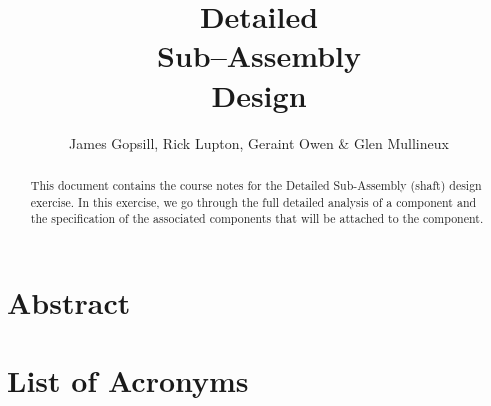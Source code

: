 \documentclass[]{course-notes}
\title{Detailed \\ Sub--Assembly\\ Design}
\author[Gopsill et al.]{\normalsize James Gopsill, Rick Lupton, Geraint Owen \& Glen Mullineux}
\begin{document}
\maketitle

\section*{Abstract}

\begin{abstract}
    This document contains the course notes for the Detailed Sub-Assembly (shaft) design exercise. 
    In this exercise, we go through the full detailed analysis of a component and the specification of the associated components that will be attached to the component. 
\end{abstract}

\setcounter{tocdepth}{2}
\tableofcontents
\listoffigures
\listoftables

\section*{List of Acronyms}
\begin{acronym}[TDMA]
\end{acronym}

\clearpage


\clearpage


\clearpage


\clearpage


\clearpage


\clearpage




\clearpage


\clearpage


\clearpage



\clearpage

\printbibliography[]

%
%
%

\appendix

\clearpage


\clearpage

\end{document}
